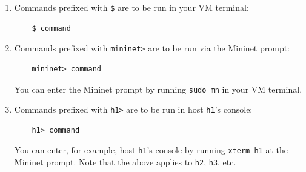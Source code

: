 \documentclass{article}
\begin{document}
\begin{enumerate}
    
    \item Commands prefixed with \texttt{\$} are to be run in your VM terminal:
    
    \begin{topbot}
    \begin{verbatim}
    $ command
    \end{verbatim}
    \end{topbot}
    
    
    
    \item Commands prefixed with \texttt{mininet>} are to be run via the Mininet prompt:
    
    \begin{topbot}
    \begin{verbatim}
    mininet> command
    \end{verbatim}
    \end{topbot}

    You can enter the Mininet prompt by running \texttt{sudo mn} in your VM terminal.
    
    \item Commands prefixed with \texttt{h1>} are to be run in host \texttt{h1}'s console:
    
    \begin{topbot}
    \begin{verbatim}
    h1> command
    \end{verbatim}
    \end{topbot}

    You can enter, for example, host \texttt{h1}'s console by running \texttt{xterm h1} at the Mininet prompt.
    Note that the above applies to \texttt{h2}, \texttt{h3}, etc.
    
    
\end{enumerate}
\end{document}
